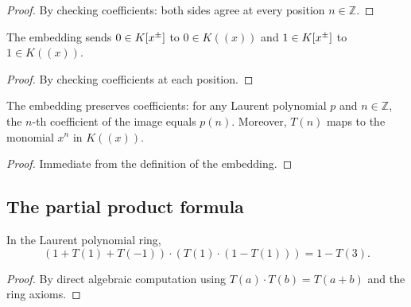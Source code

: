 \begin{proof}
\leanok
By checking coefficients: both sides agree at every position $n \in \mathbb{Z}$.
\end{proof}

\begin{lemma}
\label{lem.fps.laure.laupol-embed-one}
\leanhelper
\leanok
The embedding sends $0 \in K[x^{\pm}]$ to $0 \in K((x))$ and
$1 \in K[x^{\pm}]$ to $1 \in K((x))$.
\end{lemma}

\begin{proof}
\leanok
By checking coefficients at each position.
\end{proof}

\begin{lemma}
\label{lem.fps.laure.laupol-embed-coeff}
\leanhelper
\leanok
The embedding preserves coefficients: for any Laurent polynomial $p$
and $n \in \mathbb{Z}$, the $n$-th coefficient of the image equals
$p(n)$.
Moreover, $T(n)$ maps to the monomial $x^n$ in $K((x))$.
\end{lemma}

\begin{proof}
\leanok
Immediate from the definition of the embedding.
\end{proof}

\subsection{The partial product formula}

\begin{lemma}
\label{lem.fps.laure.one-plus-T}
\leanhelper
\leanok
In the Laurent polynomial ring,
\[
(1 + T(1) + T(-1)) \cdot (T(1) \cdot (1 - T(1))) = 1 - T(3).
\]
\end{lemma}

\begin{proof}
\leanok
By direct algebraic computation using $T(a) \cdot T(b) = T(a+b)$
and the ring axioms.
\end{proof}

